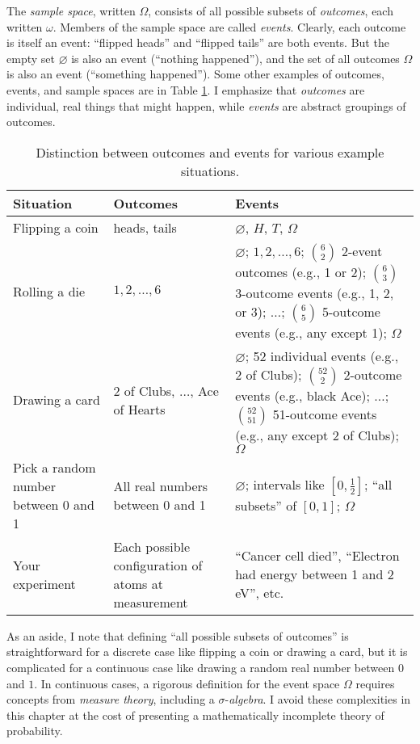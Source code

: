 The \emph{sample space}, written $\Omega$, consists of all possible subsets of
\emph{outcomes}, each written $\omega$. Members of the sample space are called
\emph{events}.  Clearly, each outcome is itself an event: ``flipped heads'' and
``flipped tails'' are both events. But the empty set $\varnothing$ is also an
event (``nothing happened''), and the set of all outcomes $\Omega$ is also an
event (``something happened''). Some other examples of outcomes, events, and
sample spaces are in Table \ref{tab:outcome-event}. I emphasize that
\emph{outcomes} are individual, real things that might happen, while
\emph{events} are abstract groupings of outcomes.

\begin{table}
\centering
\begin{tabular}{p{3cm}p{4cm}p{6cm}}
\toprule
Situation & Outcomes & Events \\
\midrule
Flipping a coin & heads, tails & $\varnothing$, $H$, $T$, $\Omega$ \\
Rolling a die & $1, 2, \ldots, 6$ & $\varnothing$; $1, 2, \ldots, 6$; $\binom{6}{2}$ 2-event outcomes (e.g., 1 or 2); $\binom{6}{3}$ 3-outcome events (e.g., 1, 2, or 3); $\ldots$; $\binom{6}{5}$ 5-outcome events (e.g., any except 1); $\Omega$ \\
Drawing a card & 2 of Clubs, $\ldots$, Ace of Hearts & $\varnothing$; 52 individual events (e.g., 2 of Clubs); $\binom{52}{2}$ 2-outcome events (e.g., black Ace); $\ldots$; $\binom{52}{51}$ 51-outcome events (e.g., any except 2 of Clubs); $\Omega$ \\
Pick a random number between 0 and 1 & All real numbers between 0 and 1 & $\varnothing$; intervals like $[0, \tfrac{1}{2}]$; ``all subsets'' of $[0, 1]$; $\Omega$ \\
Your experiment & Each possible configuration of atoms at measurement & ``Cancer cell died'', ``Electron had energy between 1 and 2 eV'', etc. \\
\bottomrule
\end{tabular}
\caption{Distinction between outcomes and events for various example
situations.}
\label{tab:outcome-event}
\end{table}

As an aside, I note that defining ``all possible subsets of outcomes'' is
straightforward for a discrete case like flipping a coin or drawing a card, but
it is complicated for a continuous case like drawing a random real number
between $0$ and $1$. In continuous cases, a rigorous definition for the event
space $\Omega$ requires concepts from \emph{measure theory}, including a
$\sigma$-\emph{algebra}. I avoid these complexities in this chapter at the cost
of presenting a mathematically incomplete theory of probability.

